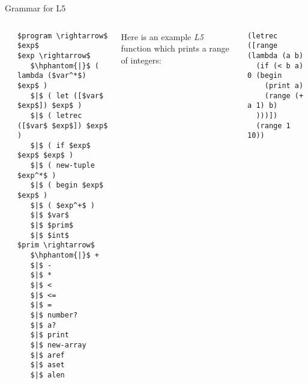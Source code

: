 \documentclass[handout]{beamer}
\begin{document}
\begin{frame}[fragile]{Grammar for L5}
\begin{columns}[t]
{\tiny\tt\bf{\begin{lstlisting}[mathescape]
$program \rightarrow$ $exp$
$exp \rightarrow$
   $\hphantom{|}$ ( lambda ($var^*$) $exp$ )
   $|$ ( let ([$var$ $exp$]) $exp$ )
   $|$ ( letrec ([$var$ $exp$]) $exp$ )
   $|$ ( if $exp$ $exp$ $exp$ )
   $|$ ( new-tuple $exp^*$ )
   $|$ ( begin $exp$ $exp$ )
   $|$ ( $exp^+$ )
   $|$ $var$
   $|$ $prim$
   $|$ $int$
$prim \rightarrow$
   $\hphantom{|}$ +
   $|$ -
   $|$ *
   $|$ < 
   $|$ <=
   $|$ =
   $|$ number?
   $|$ a?
   $|$ print
   $|$ new-array
   $|$ aref
   $|$ aset
   $|$ alen
\end{lstlisting}}}

Here is an example {\it L5} function which prints a range of integers:
{\small\begin{verbatim}
(letrec ([range (lambda (a b)
  (if (< b a) 0 (begin
    (print a)
    (range (+ a 1) b)
  )))])
  (range 1 10))
\end{verbatim}}
\end{columns}
\end{frame}

%
\end{document}
